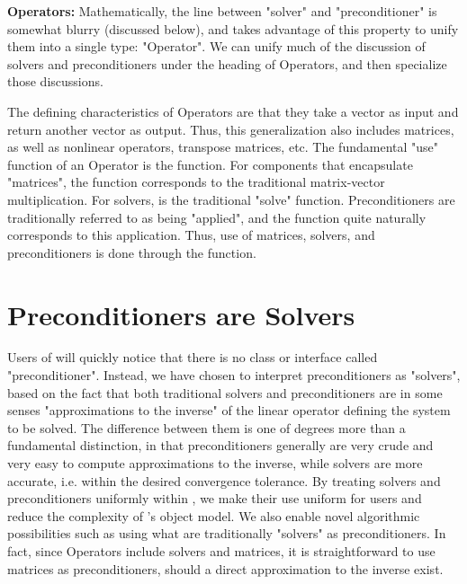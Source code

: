 

{\bf Operators:} Mathematically, the line between "solver" and "preconditioner" is
somewhat blurry (discussed 
below), and \hypre{} takes advantage of this property
to unify them into a single type: "Operator".
We can unify much of 
the discussion of solvers and preconditioners under the heading of Operators,
and then specialize those 
discussions.

The defining characteristics of Operators are that they take a vector as input
and return another vector as 
output. Thus, this generalization also includes matrices, as well as nonlinear
operators, transpose matrices, 
etc. 
The fundamental "use" function of an Operator is the  function. For
components that 
encapsulate "matrices", the  function corresponds to the traditional
matrix-vector multiplication. For 
solvers,  is the traditional "solve" function. 
Preconditioners are traditionally
referred to as being "applied", 
and the  function quite naturally corresponds to this application. 
Thus,
use of matrices, solvers, and 
preconditioners is done through the  function.

\section{Preconditioners are Solvers}

Users of \hypre{} will quickly notice that there is
no class or interface called 
"preconditioner". Instead, we have chosen to interpret preconditioners as
"solvers", based on the fact that 
both traditional solvers and preconditioners are in some senses "approximations
to the inverse" of the linear 
operator defining the system to be solved. The difference between them is one
of degrees more than a fundamental distinction, in that 
preconditioners generally are very crude and very easy to compute
approximations to the inverse, while 
solvers are more accurate, i.e. within the desired convergence tolerance. By
treating solvers and 
preconditioners uniformly within \hypre{}, we make their use uniform for users and
reduce the complexity 
of \hypre{}'s object model. We also enable novel algorithmic possibilities such as
using what are 
traditionally "solvers" as preconditioners. In fact, since Operators include
solvers and matrices, it is 
straightforward to use matrices as preconditioners, should a direct
approximation to the inverse exist. 

